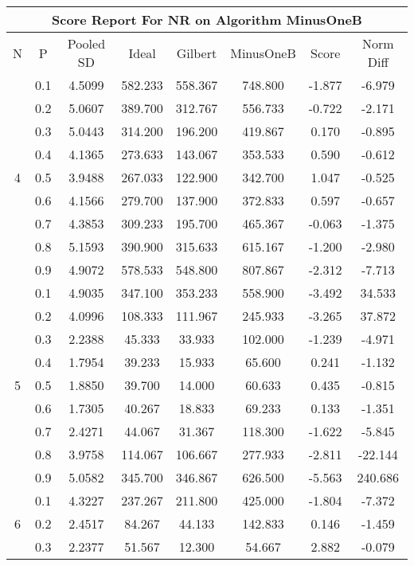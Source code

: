 \documentclass[11pt,a4paper]{report}
\begin{document}
\begin{longtable}{ | c | c || c | c | c | c | c | c | }
\hline
\multicolumn{8}{|c|}{ Score Report For NR on Algorithm MinusOneB} \\
\hline
N & P & Pooled SD &  Ideal &  Gilbert & MinusOneB  & Score & Norm Diff \\
 \hline
 \hline
 \endhead
\multirow{9}{*}{4} & 0.1 & 4.5099 & 582.233 & 558.367 & 748.800 & -1.877 & -6.979 \\
 & 0.2 & 5.0607 & 389.700 & 312.767 & 556.733 & -0.722 & -2.171 \\
 & 0.3 & 5.0443 & 314.200 & 196.200 & 419.867 & 0.170 & -0.895 \\
 & 0.4 & 4.1365 & 273.633 & 143.067 & 353.533 & 0.590 & -0.612 \\
 & 0.5 & 3.9488 & 267.033 & 122.900 & 342.700 & 1.047 & -0.525 \\
 & 0.6 & 4.1566 & 279.700 & 137.900 & 372.833 & 0.597 & -0.657 \\
 & 0.7 & 4.3853 & 309.233 & 195.700 & 465.367 & -0.063 & -1.375 \\
 & 0.8 & 5.1593 & 390.900 & 315.633 & 615.167 & -1.200 & -2.980 \\
 & 0.9 & 4.9072 & 578.533 & 548.800 & 807.867 & -2.312 & -7.713 \\
 \hline
\multirow{9}{*}{5} & 0.1 & 4.9035 & 347.100 & 353.233 & 558.900 & -3.492 & 34.533 \\
 & 0.2 & 4.0996 & 108.333 & 111.967 & 245.933 & -3.265 & 37.872 \\
 & 0.3 & 2.2388 & 45.333 & 33.933 & 102.000 & -1.239 & -4.971 \\
 & 0.4 & 1.7954 & 39.233 & 15.933 & 65.600 & 0.241 & -1.132 \\
 & 0.5 & 1.8850 & 39.700 & 14.000 & 60.633 & 0.435 & -0.815 \\
 & 0.6 & 1.7305 & 40.267 & 18.833 & 69.233 & 0.133 & -1.351 \\
 & 0.7 & 2.4271 & 44.067 & 31.367 & 118.300 & -1.622 & -5.845 \\
 & 0.8 & 3.9758 & 114.067 & 106.667 & 277.933 & -2.811 & -22.144 \\
 & 0.9 & 5.0582 & 345.700 & 346.867 & 626.500 & -5.563 & 240.686 \\
 \hline
\multirow{9}{*}{6} & 0.1 & 4.3227 & 237.267 & 211.800 & 425.000 & -1.804 & -7.372 \\
 & 0.2 & 2.4517 & 84.267 & 44.133 & 142.833 & 0.146 & -1.459 \\
 & 0.3 & 2.2377 & 51.567 & 12.300 & 54.667 & 2.882 & -0.079 \\

\end{longtable}
\end{document}

